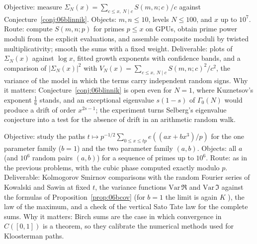 \begin{compproblem}
Objective: measure $\Sigma_N(x)=\sum_{c\le x,\ N\mid c}S(m,n;c)/c$ against Conjecture~\ref{conj:06blinnik}. Objects: $m,n\le10$, levels $N\le100$, and $x$ up to $10^7$. Route: compute $S(m,n;p)$ for primes $p\le x$ on GPUs, obtain prime power moduli from the explicit evaluations, and assemble composite moduli by twisted multiplicativity; smooth the sums with a fixed weight. Deliverable: plots of $\Sigma_N(x)$ against $\log x$, fitted growth exponents with confidence bands, and a comparison of $|\Sigma_N(x)|^2$ with $V_N(x)=\sum_{c\le x,\ N\mid c}S(m,n;c)^2/c^2$, the variance of the model in which the terms carry independent random signs. Why it matters: Conjecture~\ref{conj:06blinnik} is open even for $N=1$, where Kuznetsov's exponent $\frac16$ stands, and an exceptional eigenvalue $s(1-s)$ of $\Gamma_0(N)$ would produce a drift of order $x^{2s-1}$; the experiment turns Selberg's eigenvalue conjecture into a test for the absence of drift in an arithmetic random walk.
\end{compproblem}

\begin{compproblem}
Objective: study the paths $t\mapsto p^{-1/2}\sum_{0\le x\le tp}e((ax+bx^3)/p)$ for the one parameter family ($b=1$) and the two parameter family $(a,b)$. Objects: all $a$ (and $10^6$ random pairs $(a,b)$) for a sequence of primes up to $10^6$. Route: as in the previous problems, with the cubic phase computed exactly modulo $p$. Deliverable: Kolmogorov Smirnov comparisons with the random Fourier series of Kowalski and Sawin at fixed $t$, the variance functions $\mathrm{Var}\,\Re$ and $\mathrm{Var}\,\Im$ against the formulas of Proposition~\ref{prop:06bcov} (for $b=1$ the limit is again $K$ \cite{kowalskisawin2016}), the law of the maximum, and a check of the vertical Sato Tate law for the complete sums. Why it matters: Birch sums are the case in which convergence in $C([0,1])$ is a theorem, so they calibrate the numerical methods used for Kloosterman paths.
\end{compproblem}
